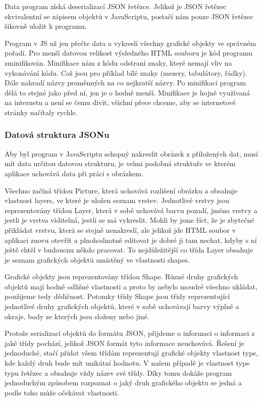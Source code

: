 \documentclass[
  field=inf,
  biblatex,
  glossaries,
  index
]{kidiplom}
\begin{document}
Data program získá deserializací JSON řetězce. Jelikož je JSON řetězec ekvivalentní se zápisem objektů v JavaScriptu, postačí nám pouze JSON řetězec šikovně uložit k programu.

Program v JS už jen přečte data a vykreslí všechny grafické objekty ve správném pořadí. Pro menší datovou velikost výsledného HTML souboru je kód programu zminifikován. Minifikace nám z kódu odstraní znaky, které nemají vliv na vykonávání kódu. Což jsou pro příklad bílé znaky (mezery, tabulátory, řádky). Dále nahradí názvy proměnných na co nejkratší názvy. Po minifikaci program dělá to stejné jako před ní, jen je o hodně menší. Minifikace je hojně využívaná na internetu a není se čemu divit, všichni přece chceme, aby se internetové stránky načítaly rychle.

\subsubsection{Datová struktura JSONu}
Aby byl program v JavaScriptu schopný nakreslit obrázek z přiložených dat, musí mít data určitou datovou strukturu, je velmi podobná struktuře ve kterém aplikace uchovává data při práci s obrázkem.

Všechno začíná třídou Picture, která uchovává rozlišení obrázku a obsahuje vlastnost layers, ve které je uložen seznam vrstev. Jednotlivé vrstvy jsou reprezentovány třídou Layer, která v sobě uchovává barvu pozadí, jméno vrstvy a jestli je vrstva viditelná, jestli se má vykreslit. Mohli by jsme říct, že je zbytečné přikládat vrstvu, která se stejně nenakreslí, ale jelikož jde HTML soubor v aplikaci znovu otevřít a plnohodnotně editovat je dobré ji tam nechat, kdyby s ní ještě chtěl v budoucnu někdo pracovat. To nejdůležitější co třída Layer obsahuje je seznam grafických objektů  umístěný ve vlastnosti shapes.

Grafické objekty jsou reprezentovány třídou Shape. Různé druhy grafických objektů mají hodně odlišné vlastnosti a proto by nebylo moudré všechno ukládat, použijeme tedy dědičnost. Potomky třídy Shape jsou třídy reprezentující jednotlivé druhy grafických objektů, které v sobě uchovávají barvy výplně a okraje, body ze kterých jsou složeny nebo jiné.

Protože serializací objektů do formátu JSON, přijdeme o informaci o informaci z jaké třídy pochází, jelikož JSON formát tyto informace neuchovává. Řešení je jednoduché, stačí přidat všem třídám reprezentují grafické objekty vlastnost type, kde každý druh bude mít unikátní hodnotu. V našem případě je vlastnost type typu řetězec a obsahuje vždy název své třídy. Díky tomu dokáže program jednoduchým způsobem rozpoznat o jaký druh grafického objektu se jedná a podle toho může očekávat vlastnosti.
\end{document}
